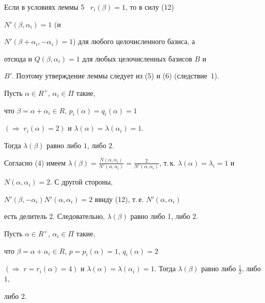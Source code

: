 \begin{pf}


Если в условиях леммы 5 \ $r_i(\beta)=1$, то в силу (12) 


$N'(\beta,\alpha_i)=1$ (и


$N'(\beta+\alpha_i,-\alpha_i)=1$) для любого целочисленного базиса, а


отсюда и $Q(\beta,\alpha_i)=1$ для любых целочисленных базисов $B$ и


$B'$. Поэтому утверждение леммы следует из (5) и (6) (следствие~1).


\end{pf}





\begin{lem}


Пусть $\alpha\in R^+$, $\alpha_i\in\Pi$ такие,


что $\beta=\alpha+\alpha_i\in R$, $p_i(\alpha)=q_i(\alpha)=1$


$(\Rightarrow\;r_i(\alpha)=2)$ и $\lambda(\alpha)=\lambda(\alpha_i)=1$.


Тогда $\lambda(\beta)$ равно либо $1$, либо $2$.


\end{lem}





\begin{pf}


Согласно (4) имеем $\lambda(\beta)=


\frac{N(\alpha,\alpha_i)}{N'(\alpha,\alpha_i)}=


\frac2{N'(\alpha,\alpha_i)}$, т.\,к. $\lambda(\alpha)=\lambda_i=1$ и


$N(\alpha,\alpha_i)=2$.  С другой стороны, 


$N'(\beta,-\alpha_i)N'(\alpha,\alpha_i)=2$ ввиду (12), т.\,е. $N'(\alpha,\alpha_i)$


есть делитель 2. Следовательно, $\lambda(\beta)$ равно либо 1, либо 2.


\end{pf}





\begin{lem}


Пусть $\alpha\in R^+$, $\alpha_i\in\Pi$ такие,


что $\beta=\alpha+\alpha_i\in R$, $p=p_i(\alpha)=1$, $q_i(\alpha)=2$


$(\Rightarrow\;r=r_i(\alpha)=4)$ и $\lambda(\alpha)=


\lambda(\alpha_i)=1$. Тогда $\lambda(\beta)$ равно либо $\frac12$, либо $1$,


либо $2$.


\end{lem}





